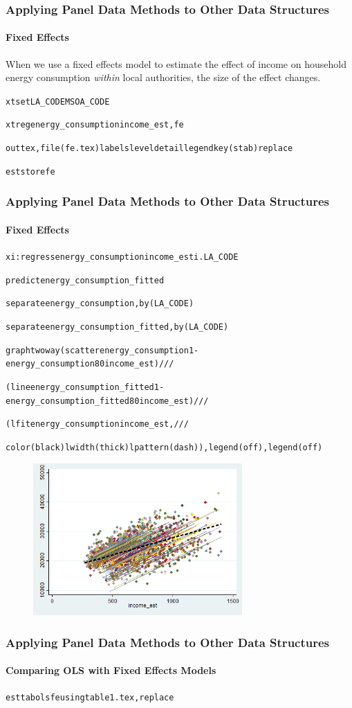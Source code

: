 \documentclass{beamer}
\begin{document}
  \begin{frame}
    \frametitle{Applying Panel Data Methods to Other Data Structures}
    \framesubtitle{Fixed Effects}
    When we use a fixed effects model to estimate the effect of income on household energy consumption \textit{within} local authorities, the size of the effect changes.
    \tiny
    \begin{alltt}
    xtset LA\_CODE MSOA\_CODE
    
    xtreg energy\_consumption income\_est, fe
    
    outtex, file(fe.tex) labels level detail legend key(stab) replace
    
    est store fe
    \end{alltt}
    
    
    
  \end{frame}
  
  \begin{frame}
    \frametitle{Applying Panel Data Methods to Other Data Structures}
    \framesubtitle{Fixed Effects}
    \tiny
    \begin{alltt}
xi: regress energy\_consumption income\_est i.LA\_CODE

predict energy\_consumption\_fitted

separate energy\_consumption, by(LA\_CODE)

separate energy\_consumption\_fitted, by(LA\_CODE)

graph twoway (scatter energy\_consumption1-energy\_consumption80 income\_est) ///
	
	(line energy\_consumption\_fitted1-energy\_consumption\_fitted80 income\_est) ///
	
	(lfit energy\_consumption income\_est, ///
	
	color(black) lwidth(thick) lpattern(dash)), legend(off) , legend(off) 
    \end{alltt}
    
    \begin{figure}
    \includegraphics[width=8cm]{../stata_code/fe.png}
    \centering
    \end{figure}
  \end{frame}
  
  \begin{frame}
    \frametitle{Applying Panel Data Methods to Other Data Structures}
    \framesubtitle{Comparing OLS with Fixed Effects Models}
    \tiny
    \begin{alltt}
      esttab ols fe using table1.tex, replace
    \end{alltt}
    \small
    
    
  \end{frame}
\end{document}
